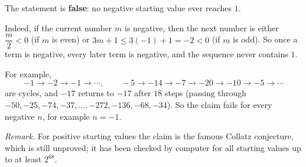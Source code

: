 The statement is \textbf{false}: no negative starting value ever reaches $1$.

Indeed, if the current number $m$ is negative, then the next number is either $\dfrac {m}{2}<0$ (if $m$ is even) or $3m+1\le3(-1)+1=-2<0$ (if $m$ is odd). So once a term is negative, every later term is negative, and the sequence never contains $1$.

For example,
\[-1\to-2\to-1\to\cdots,\qquad -5\to-14\to-7\to-20\to-10\to-5\to\cdots\]
are cycles, and $-17$ returns to $-17$ after $18$ steps (passing through $-50,-25,-74,-37,\dots,-272,-136,-68,-34$). So the claim fails for every negative $n$, for example $\boxed{n=-1}$.

\emph{Remark.} For positive starting values the claim is the famous Collatz conjecture, which is still unproved; it has been checked by computer for all starting values up to at least $2^{68}$.

